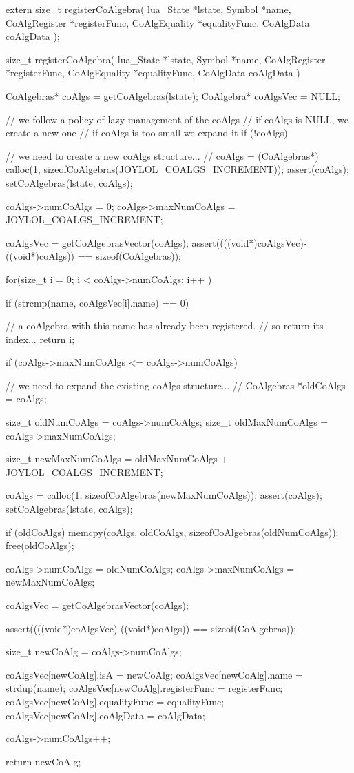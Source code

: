 extern size_t registerCoAlgebra(
  lua_State     *lstate,
  Symbol        *name,
  CoAlgRegister *registerFunc,
  CoAlgEquality *equalityFunc,
  CoAlgData      coAlgData
);
\stopCHeader

\startCCode
size_t registerCoAlgebra(
  lua_State     *lstate,
  Symbol        *name,
  CoAlgRegister *registerFunc,
  CoAlgEquality *equalityFunc,
  CoAlgData     coAlgData
) {
  CoAlgebras* coAlgs    = getCoAlgebras(lstate);
  CoAlgebra*  coAlgsVec = NULL;

  // we follow a policy of lazy management of the coAlgs
  // if coAlgs is NULL, we create a new one
  // if coAlgs is too small we expand it
  if (!coAlgs) {
    // we need to create a new coAlgs structure...
    //
    coAlgs = (CoAlgebras*)
      calloc(1, sizeofCoAlgebras(JOYLOL_COALGS_INCREMENT));
    assert(coAlgs);
    setCoAlgebras(lstate, coAlgs);
    
    coAlgs->numCoAlgs    = 0;
    coAlgs->maxNumCoAlgs = JOYLOL_COALGS_INCREMENT;
  }
  coAlgsVec = getCoAlgebrasVector(coAlgs);
  assert((((void*)coAlgsVec)-((void*)coAlgs)) == sizeof(CoAlgebras));

  for(size_t i = 0; i < coAlgs->numCoAlgs; i++ ) {
    if (strcmp(name, coAlgsVec[i].name) == 0) {
    
      // a coAlgebra with this name has already been registered. 
      // so return its index...
      return i;
    }
  }
  
  if (coAlgs->maxNumCoAlgs <= coAlgs->numCoAlgs) {
    // we need to expand the existing coAlgs structure...
    //  
    CoAlgebras *oldCoAlgs  = coAlgs;
    
    size_t oldNumCoAlgs    = coAlgs->numCoAlgs;
    size_t oldMaxNumCoAlgs = coAlgs->maxNumCoAlgs;
    
    size_t newMaxNumCoAlgs =
      oldMaxNumCoAlgs + JOYLOL_COALGS_INCREMENT;

    coAlgs = calloc(1, sizeofCoAlgebras(newMaxNumCoAlgs));
    assert(coAlgs);
    setCoAlgebras(lstate, coAlgs);
    
    if (oldCoAlgs) {
      memcpy(coAlgs, oldCoAlgs,
        sizeofCoAlgebras(oldNumCoAlgs));
      free(oldCoAlgs);
    }
    
    coAlgs->numCoAlgs    = oldNumCoAlgs;
    coAlgs->maxNumCoAlgs = newMaxNumCoAlgs;

    coAlgsVec = getCoAlgebrasVector(coAlgs);
  }
  assert((((void*)coAlgsVec)-((void*)coAlgs)) == sizeof(CoAlgebras));
  
  size_t newCoAlg = coAlgs->numCoAlgs;
  
  coAlgsVec[newCoAlg].isA           = newCoAlg;
  coAlgsVec[newCoAlg].name          = strdup(name);
  coAlgsVec[newCoAlg].registerFunc  = registerFunc;
  coAlgsVec[newCoAlg].equalityFunc  = equalityFunc;
  coAlgsVec[newCoAlg].coAlgData     = coAlgData;
  
  coAlgs->numCoAlgs++;
  
  return newCoAlg;
}
\stopCCode

